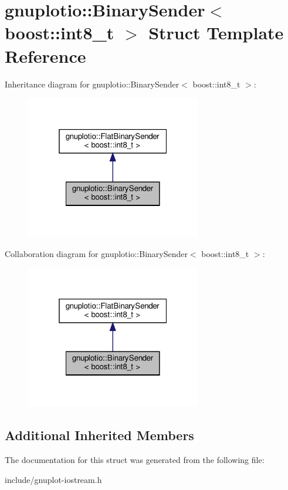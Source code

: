 \hypertarget{structgnuplotio_1_1BinarySender_3_01boost_1_1int8__t_01_4}{}\section{gnuplotio\+:\+:Binary\+Sender$<$ boost\+:\+:int8\+\_\+t $>$ Struct Template Reference}
\label{structgnuplotio_1_1BinarySender_3_01boost_1_1int8__t_01_4}


Inheritance diagram for gnuplotio\+:\+:Binary\+Sender$<$ boost\+:\+:int8\+\_\+t $>$\+:\nopagebreak
\begin{figure}[H]
\begin{center}
\leavevmode
\includegraphics[width=217pt]{structgnuplotio_1_1BinarySender_3_01boost_1_1int8__t_01_4__inherit__graph}
\end{center}
\end{figure}


Collaboration diagram for gnuplotio\+:\+:Binary\+Sender$<$ boost\+:\+:int8\+\_\+t $>$\+:\nopagebreak
\begin{figure}[H]
\begin{center}
\leavevmode
\includegraphics[width=217pt]{structgnuplotio_1_1BinarySender_3_01boost_1_1int8__t_01_4__coll__graph}
\end{center}
\end{figure}
\subsection*{Additional Inherited Members}


The documentation for this struct was generated from the following file\+:\begin{DoxyCompactItemize}
\item 
include/gnuplot-\/iostream.\+h\end{DoxyCompactItemize}
